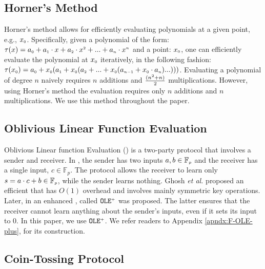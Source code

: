 \subsection{Horner's Method}
Horner's method \cite{DBLP:journals/ibmrd/Dorn62} allows for efficiently evaluating polynomials at a given point, e.g., $x_{\scriptscriptstyle 0}$. Specifically, given a polynomial of the form: $\tau(x)= a_{\scriptscriptstyle 0}+a_{\scriptscriptstyle 1}\cdot x+a_{\scriptscriptstyle 2}\cdot x^{\scriptscriptstyle 2}+...+a_{\scriptscriptstyle n}\cdot x^{\scriptscriptstyle n}$ and a point: $x_{\scriptscriptstyle 0}$, one can efficiently evaluate the polynomial at $x_{\scriptscriptstyle 0}$ iteratively, in the following fashion: $\tau(x_{\scriptscriptstyle 0})=a_{\scriptscriptstyle 0}+x_{\scriptscriptstyle 0}(a_{\scriptscriptstyle 1} + x_{\scriptscriptstyle 0}(a_{\scriptscriptstyle 2}+...+x_{\scriptscriptstyle 0}(a_{\scriptscriptstyle n-1}+x_{\scriptscriptstyle 0}\cdot a_{\scriptscriptstyle n})...)))$. Evaluating  a polynomial of degree $n$ naively requires  $n$ additions and $\frac{(n^{\scriptscriptstyle 2}+n)}{2}$ multiplications. However, using Horner's method the evaluation requires only $n$ additions and $n$ multiplications. We use this method throughout the paper. 


\subsection{Oblivious Linear Function Evaluation}\label{sec::OLE-plus}

Oblivious Linear function Evaluation (\ole) is a two-party protocol that involves a sender and receiver. In \ole,  the sender  has two  inputs  $a, b\in \mathbb{F}_{\scriptscriptstyle p}$ and the receiver has a single input, $c \in \mathbb{F}_{p}$.  The protocol allows the receiver to learn only $s = a\cdot c + b \in \mathbb{F}_{\scriptscriptstyle p}$, while the sender learns nothing. Ghosh \textit{et al.} \cite{GhoshNN17} proposed an efficient \ole that has $O(1)$ overhead and involves mainly symmetric key operations. Later, in \cite{GhoshN19} an enhanced \ole, called $\mathtt{OLE}^{\scriptscriptstyle +}$ was proposed. The latter ensures that the receiver cannot learn anything about the sender's inputs,  even if it sets its input to $0$. In this paper, we use $\mathtt{OLE}^{\scriptscriptstyle +}$. We refer readers to Appendix \ref{apndx:F-OLE-plus}, for its construction.  %



\subsection{Coin-Tossing Protocol}

